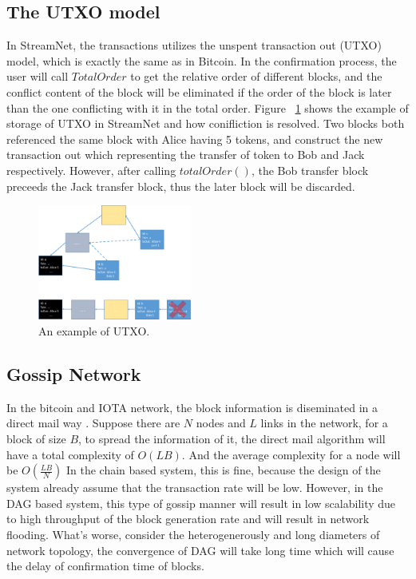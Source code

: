 \subsection{The UTXO model}

In StreamNet, the transactions utilizes the unspent transaction out (UTXO) model, which is exactly the same as in Bitcoin.
In the confirmation process, the user will call $TotalOrder$ to get the relative order of different blocks, 
and the conflict content of the block will be eliminated if the order of the block is later than the one conflicting with it in the total order.
Figure ~\ref{utxo} shows the example of storage of UTXO in StreamNet and how conifliction is resolved.
Two blocks both referenced the same block with Alice having 5 tokens, and construct the new transaction out which representing the transfer of token to Bob and Jack respectively.
However, after calling $totalOrder()$, the Bob transfer block preceeds the Jack transfer block, thus the later block will be discarded.

\begin{figure}[!ht]
\begin{center}
\includegraphics[width=0.45\textwidth]{figures/utxo.pdf}
    \caption{
        An example of UTXO.
     }
\label{utxo}
\end{center}
\end{figure}

\subsection{Gossip Network}
In the bitcoin and IOTA network, the block information is diseminated in a direct mail way \cite{demers1988epidemic}.
Suppose there are $N$ nodes and $L$ links in the network, for a block of size $B$,
to spread the information of it, the direct mail algorithm will have a total complexity of $O(LB)$.
And the average complexity for a node will be $O(\frac{LB}{N})$
In the chain based system, this is fine, because the design of the system already assume that the transaction rate will be low.
However, in the DAG based system, this type of gossip manner will result in 
low scalability due to high throughput of the block generation rate and will result in network flooding.
What's worse, consider the heterogenerously and long diameters of network topology, 
the convergence of DAG will take long time which will cause the delay of confirmation time of blocks.

